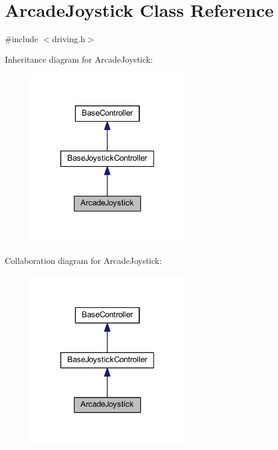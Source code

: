 \hypertarget{class_arcade_joystick}{\section{\-Arcade\-Joystick \-Class \-Reference}
\label{class_arcade_joystick}
}


{\ttfamily \#include $<$driving.\-h$>$}



\-Inheritance diagram for \-Arcade\-Joystick\-:\nopagebreak
\begin{figure}[H]
\begin{center}
\leavevmode
\includegraphics[width=196pt]{class_arcade_joystick__inherit__graph}
\end{center}
\end{figure}


\-Collaboration diagram for \-Arcade\-Joystick\-:\nopagebreak
\begin{figure}[H]
\begin{center}
\leavevmode
\includegraphics[width=196pt]{class_arcade_joystick__coll__graph}
\end{center}
\end{figure}
